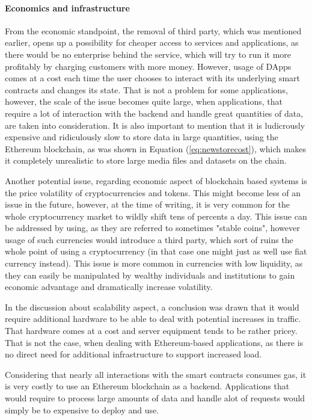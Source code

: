 \paragraph{Economics and infrastructure}
From the economic standpoint, the removal of third party, which was mentioned earlier, opens up a possibility for cheaper access to services and applications, as there would be no enterprise behind the service, which will try to run it more profitably by charging customers with more money. However, usage of DApps comes at a cost each time the user chooses to interact with its underlying smart contracts and changes its state. That is not a problem for some applications, however, the scale of the issue becomes quite large, when applications, that require a lot of interaction with the backend and handle great quantities of data, are taken into consideration. It is also important to mention that it is ludicrously expensive and ridiculously slow to store data in large quantities, using the Ethereum blockchain, as was shown in Equation (\ref{eq:newstorecost}), which makes it completely unrealistic to store large media files and datasets on the chain.

Another potential issue, regarding economic aspect of blockchain based systems is the price volatility of cryptocurrencies and tokens. This might become less of an issue in the future, however, at the time of writing, it is very common for the whole cryptocurrency market to wildly shift tens of percents a day. This issue can be addressed by using, as they are referred to sometimes "stable coins", however usage of such currencies would introduce a third party, which sort of ruins the whole point of using a cryptocurrency (in that case one might just as well use fiat currency instead). This issue is more common in currencies with low liquidity, as they can easily be manipulated by wealthy individuals and institutions to gain economic advantage and dramatically increase volatility.

In the discussion about scalability aspect, a conclusion was drawn that it would require additional hardware to be able to deal with potential increases in traffic. That hardware comes at a cost and server equipment tends to be rather pricey. That is not the case, when dealing with Ethereum-based applications, as there is no direct need for additional infrastructure to support increased load.

Considering that nearly all interactions with the smart contracts consumes gas, it is very costly to use an Ethereum blockchain as a backend. Applications that would require to process large amounts of data and handle alot of requests would simply be to expensive to deploy and use.

